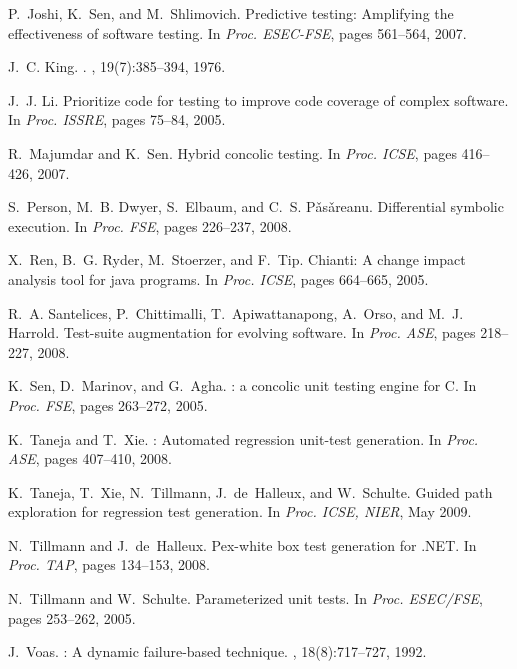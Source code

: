 \documentclass{sig-alternate}
\begin{document}
\begin{thebibliography}{10}
\begin{scriptsize}
P.~Joshi, K.~Sen, and M.~Shlimovich.
\newblock Predictive testing: Amplifying the effectiveness of software testing.
\newblock In {\em Proc. ESEC-FSE}, pages 561--564, 2007.

J.~C. King.
.
, 19(7):385--394, 1976.

J.~J. Li.
\newblock Prioritize code for testing to improve code coverage of complex
  software.
\newblock In {\em Proc. ISSRE}, pages 75--84, 2005.

R.~Majumdar and K.~Sen.
\newblock Hybrid concolic testing.
\newblock In {\em Proc. ICSE}, pages 416--426, 2007.

S.~Person, M.~B. Dwyer, S.~Elbaum, and C.~S. P\v{a}s\v{a}reanu.
\newblock Differential symbolic execution.
\newblock In {\em Proc. FSE}, pages 226--237, 2008.

X.~Ren, B.~G. Ryder, M.~Stoerzer, and F.~Tip.
\newblock Chianti: A change impact analysis tool for java programs.
\newblock In {\em Proc. ICSE}, pages 664--665, 2005.

R.~A. Santelices, P.~Chittimalli, T.~Apiwattanapong, A.~Orso, and M.~J.
  Harrold.
\newblock Test-suite augmentation for evolving software.
\newblock In {\em Proc. ASE}, pages 218--227, 2008.

K.~Sen, D.~Marinov, and G.~Agha.
: a concolic unit testing engine for {C}.
\newblock In {\em Proc. FSE}, pages 263--272, 2005.

K.~Taneja and T.~Xie.
: Automated regression unit-test generation.
\newblock In {\em Proc. ASE}, pages 407--410, 2008.

K.~Taneja, T.~Xie, N.~Tillmann, J.~de~Halleux, and W.~Schulte.
\newblock Guided path exploration for regression test generation.
\newblock In {\em Proc. ICSE, NIER}, May 2009.

N.~Tillmann and J.~de~Halleux.
\newblock Pex-white box test generation for {.{N}{E}{T}}.
\newblock In {\em Proc. TAP}, pages 134--153, 2008.

N.~Tillmann and W.~Schulte.
\newblock Parameterized unit tests.
\newblock In {\em Proc. ESEC/FSE}, pages 253--262, 2005.

J.~Voas.
: A dynamic failure-based technique.
, 18(8):717--727, 1992.


\end{scriptsize}
\end{thebibliography}
\end{document}

